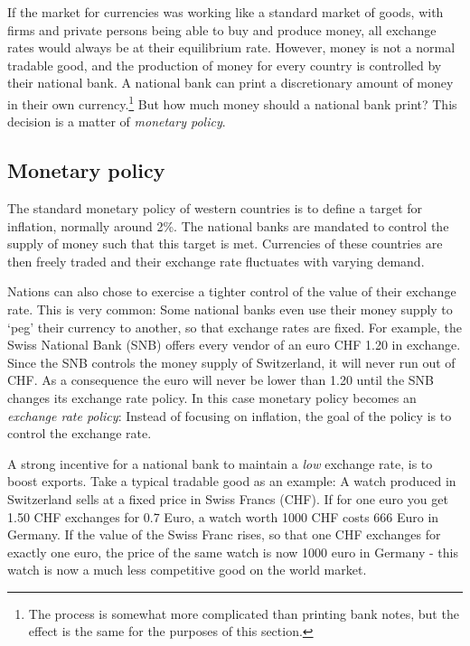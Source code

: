 If the market for currencies was working like a standard market of 
goods, with firms and private persons being able to buy and produce 
money, all exchange rates would always be at their equilibrium rate.  
However, money is not a normal tradable good, and the production of 
money for every country is controlled by their national bank. A national 
bank can print a discretionary amount of money in their own 
currency.\footnote{The process is somewhat more complicated than 
printing bank notes, but the effect is the same for the purposes of this 
section.} But how much money should a national bank print? This decision 
is a matter of \emph{monetary policy}. 

\subsection{Monetary policy}

The standard monetary policy of western countries is to define a target 
for inflation, normally around 2\%. The national banks are mandated to 
control the supply of money such that this target is met. Currencies of 
these countries are then freely traded and their exchange rate 
fluctuates with varying demand. 

Nations can also chose to exercise a tighter control of the value of 
their exchange rate.  This is very common: Some national banks even use 
their money supply to `peg' their currency to another, so that exchange 
rates are fixed.  For example, the Swiss National Bank (SNB) offers 
every vendor of an euro CHF 1.20 in exchange.  Since the SNB controls 
the money supply of Switzerland, it will never run out of CHF. As a 
consequence the euro will never be lower than 1.20 until the SNB changes 
its exchange rate policy. In this case monetary policy becomes an 
\emph{exchange rate policy}: Instead of focusing on inflation, the goal 
of the policy is to control the exchange rate.

A strong incentive for a national bank to maintain a \emph{low} exchange 
rate, is to boost exports. Take a typical tradable good as an example: A 
watch produced in Switzerland sells at a fixed price in Swiss Francs 
(CHF). If for one euro you get 1.50 CHF exchanges for 0.7 Euro, a watch 
worth 1000 CHF costs 666 Euro in Germany. If the value of the Swiss 
Franc rises, so that one CHF exchanges for exactly one euro, the price 
of the same watch is now 1000 euro in Germany - this watch is now a much 
less competitive good on the world market.

